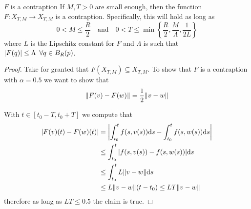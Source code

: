 \documentclass[12pt]{extarticle}
\numberwithin{equation}{section}
\begin{document}
\begin{proposition}{$F$ is a contraption}{}
    If $M, T > 0$ are small enough, then the function $F: X_{T, M} \to X_{T, M}$
    is a contraption.
    Specifically, this will hold as long as
    \begin{equation}
        0 < M \leq \frac{R}{2} \quad \text{and} \quad 0 < T \leq \min \left\{ \frac{R}{2}, \frac{M}{\Lambda}, \frac{1}{2L} \right\}
    \end{equation}
    where $L$ is the Lipschitz constant for $F$ and
    $\Lambda$ is such that $\abs{F(q)} \leq \Lambda \enspace \forall q \in B_R(p)$.
\end{proposition}

\begin{proof}
    Take for granted that $F(X_{T, M}) \subseteq X_{T, M}$.
    To show that $F$ is a contraption with $\alpha = 0.5$ we want to show that
    \begin{equation}
        \norm{F(v) - F(w)} = \frac{1}{2} \norm{v-w}
    \end{equation}

    With $t \in [t_0 - T, t_0 + T]$ we compute that
    \begin{align}
        \abs{F(v)(t) - F(w)(t)} & = \abs{\int_{t_0}^{t} f(s,v(s)) \dd s - \int_{t_0}^{t} f(s,w(s)) \dd s} \\
                                & \leq \int_{t_0}^{t} \abs{f(s,v(s)) - f(s,w(s))} \dd s                   \\
                                & \leq \int_{t_0}^{t} L\norm{v - w} \dd s                                 \\
                                & \leq L \norm{v - w} (t - t_0) \leq LT \norm{v - w}                      
    \end{align}
    therefore as long as $LT \leq 0.5$ the claim is true.
\end{proof}
\end{document}

